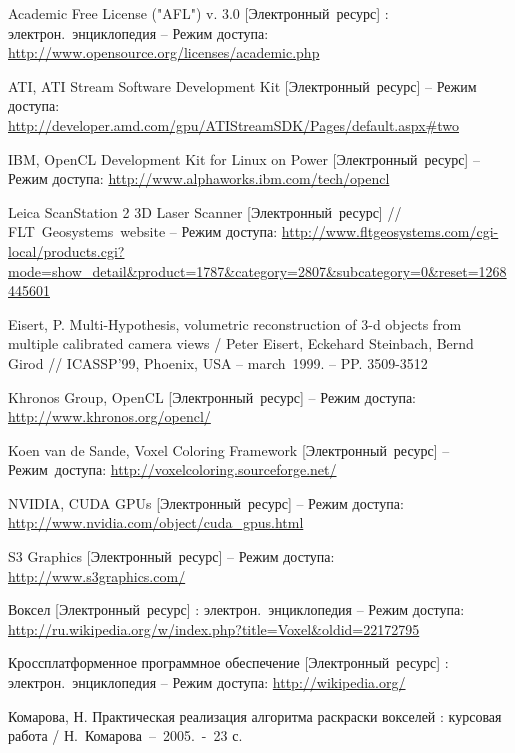 \renewcommand{\refname}{Список литературы}
\begin{thebibliography}{99}

		Academic Free License ("AFL") v. 3.0 [Электронный~ресурс] : электрон.~энциклопедия -- Режим доступа:
		\url{http://www.opensource.org/licenses/academic.php}

		ATI, ATI Stream Software Development Kit [Электронный~ресурс] -- Режим доступа:
		\url{http://developer.amd.com/gpu/ATIStreamSDK/Pages/default.aspx#two}

		IBM, OpenCL Development Kit for Linux on Power [Электронный~ресурс]
		-- Режим доступа:
		\url{http://www.alphaworks.ibm.com/tech/opencl}

		Leica ScanStation 2 3D Laser Scanner [Электронный~ресурс] // FLT~Geosystems~website -- Режим доступа:
		\url{http://www.fltgeosystems.com/cgi-local/products.cgi?mode=show_detail&product=1787&category=2807&subcategory=0&reset=1268445601}

		Eisert, P. Multi-Hypothesis, volumetric reconstruction of 3-d objects from multiple calibrated camera views /
		Peter Eisert, Eckehard Steinbach, Bernd Girod //
		ICASSP’99, Phoenix, USA -- march~1999. -- PP. 3509-3512

		Khronos Group, OpenCL [Электронный~ресурс] -- Режим доступа:
		\url{http://www.khronos.org/opencl/}

		Koen van de Sande, Voxel Coloring Framework [Электронный~ресурс] -- Режим~доступа:
		\url{http://voxelcoloring.sourceforge.net/}

		NVIDIA, CUDA GPUs [Электронный~ресурс] -- Режим доступа:
		\url{http://www.nvidia.com/object/cuda_gpus.html}

		S3 Graphics [Электронный~ресурс] -- Режим доступа:
		\url{http://www.s3graphics.com/}

			Воксел [Электронный~ресурс] : электрон.~энциклопедия -- Режим доступа: \url{http://ru.wikipedia.org/w/index.php?title=Voxel&oldid=22172795}
	
		Кроссплатформенное программное обеспечение [Электронный~ресурс] : электрон.~энциклопедия -- Режим доступа:
		\url{http://wikipedia.org/}

		Комарова, Н. Практическая реализация алгоритма раскраски вокселей : курсовая работа / 
		Н.~Комарова~--~2005.~-~23 с.
	


\end{thebibliography}

